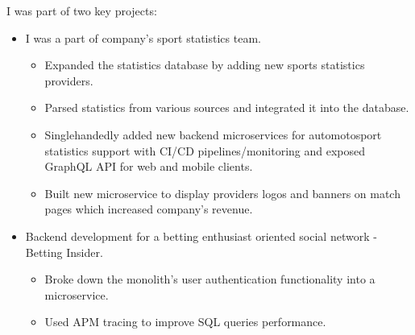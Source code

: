 I was part of two key projects:

\begin{itemize}
    \item I was a part of company's sport statistics team. 
        \begin{itemize}
            \item Expanded the statistics database by adding new sports statistics providers.
            \item Parsed statistics from various sources and integrated it into the database.
            \item Singlehandedly added new backend microservices for automotosport statistics 
                    support with CI/CD pipelines/monitoring and exposed GraphQL API for web and mobile clients. 
            \item Built new microservice to display providers logos and banners on match pages which 
                increased company's revenue.
        \end{itemize}
    \item Backend development for a betting enthusiast oriented social network - Betting Insider. 
        \begin{itemize}
            \item Broke down the monolith's user authentication functionality into a microservice.
            \item Used APM tracing to improve SQL queries performance.
        \end{itemize} 
    \end{itemize}
